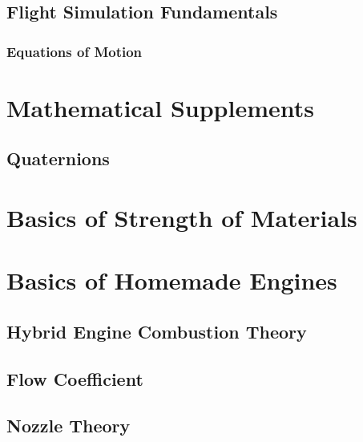 \documentclass[uplatex,dvipdfmx,a4j,11pt]{report}
\numberwithin{equation}{chapter}
\begin{document}
\section{Flight Simulation Fundamentals}
\subsection{Equations of Motion}

\appendix

\chapter{Mathematical Supplements}
\section{Quaternions}

\chapter{Basics of Strength of Materials}

\chapter{Basics of Homemade Engines}
\section{Hybrid Engine Combustion Theory}
\section{Flow Coefficient}
\section{Nozzle Theory}



\end{document}

